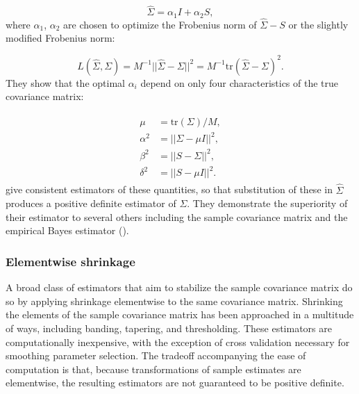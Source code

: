 \begin{equation} \label{eq:ledoit-wolf-estimator}
\hat{\Sigma} = \alpha_1 I + \alpha_2 S,
\end{equation}
\noindent
where $\alpha_1$, $\alpha_2$ are chosen to optimize the Frobenius norm of $\hat{\Sigma} - S$ or the slightly modified Frobenius norm:

\[
L\left(\hat{\Sigma},\Sigma\right) = M^{-1} \vert \vert\hat{\Sigma}-\Sigma   \vert \vert^2 = M^{-1} \mbox{tr}\left(\hat{\Sigma}-\Sigma \right)^2.
\] 
\noindent
They show that the optimal $\alpha_i$ depend on only four characteristics of the true covariance matrix:

\begin{align}
\begin{split}
\mu &= \mbox{tr}\left(\Sigma\right)/M, \\
\alpha^2 &= \vert\vert \Sigma - \mu I\vert\vert^2, \\
\beta^2 &= \vert\vert S - \Sigma  \vert\vert^2, \\
\delta^2 &= \vert\vert S - \mu I\vert\vert^2.
\end{split}
\end{align}
\noindent
\cite{ledoit2004well} give consistent estimators of these quantities, so that substitution of these in $\hat{\Sigma}$ produces a positive definite estimator of $\Sigma$. They demonstrate the superiority of their estimator to several others including the sample covariance matrix and the empirical Bayes estimator (\cite{haff1980empirical}).


\subsubsection{Elementwise shrinkage} \label{elementwise-shrinkage-estimators}
A broad class of estimators that aim to stabilize the sample covariance matrix do so by applying shrinkage elementwise to the same covariance matrix. Shrinking the elements of the sample covariance matrix has been approached in a multitude of ways, including banding, tapering, and thresholding. These estimators are computationally inexpensive, with the exception of cross validation necessary for smoothing parameter selection. The tradeoff accompanying the ease of computation is that, because transformations of sample estimates are elementwise, the resulting estimators are not guaranteed to be positive definite.

\bigskip
 
